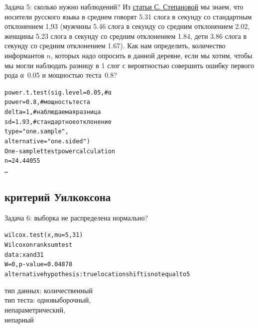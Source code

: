 \begin{frame}{Задача 5: сколько нужно наблюдений?}
Из \href{https://www.internationalphoneticassociation.org/icphs-proceedings/ICPhS2011/OnlineProceedings/RegularSession/Stepanova/Stepanova.pdf}{\alert{статьи С. Степановой}} мы знаем, что носители русского языка в среднем говорят 5.31 слога в секунду со стандартным отклонением 1,93 (мужчины 5.46 слога в секунду  со средним отклонением 2.02, женщины 5.23 слога в секунду  со средним отклонением 1.84, дети 3.86 слога в секунду со средним отклонением 1.67). Как нам определить, количество информантов $n$, которых надо опросить в данной деревне, если мы хотим, чтобы мы могли наблюдать разницу в 1 слог с вероятностью совершить ошибку первого рода α~0.05 и мощностью теста~0.8? \pause
\vfill
\scriptsize
\begin{alltt}
\alert{power.t.test(sig.level = 0.05, \hfill \# α\\
			power = 0.8, \hfill \# мощность теста\\
             delta = 1, \hfill \# наблюдаемая разница\\
             sd = 1.93, \hfill \# стандартное отклонение\\
              type = "one.sample",\\
             alternative = "one.sided")}
\medskip\\
One-sample t test power calculation \\
\alert{n = 24.44055} \\
\dots
\end{alltt}
\normalsize
\end{frame}
\subsection{критерий Уилкоксона}
\begin{frame}{Задача 6: выборка не распределена нормально?}
\scriptsize
\begin{alltt}
\alert{wilcox.test(x, mu = 5,31)}\medskip\\
Wilcoxon rank sum test\\
data:  x and 31\\
\alert{W = 0, p-value = 0.04878}\\
alternative hypothesis: true location shift is not equal to 5
\end{alltt}
\normalsize
\vfill
тип данных: количественный\\
тип теста: одновыборочный,\\
непараметрический,\\
непарный
\end{frame}
